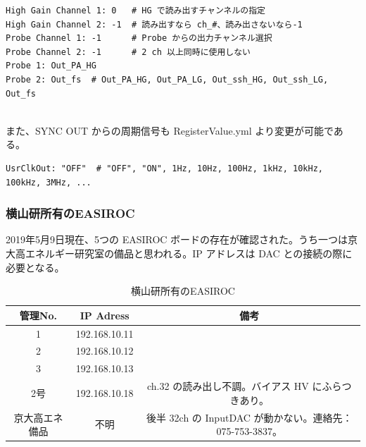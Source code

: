 \begin{shadebox}
\begin{verbatim}
High Gain Channel 1: 0   # HG で読み出すチャンネルの指定
High Gain Channel 2: -1  # 読み出すなら ch_#、読み出さないなら-1
Probe Channel 1: -1      # Probe からの出力チャンネル選択
Probe Channel 2: -1      # 2 ch 以上同時に使用しない
Probe 1: Out_PA_HG
Probe 2: Out_fs  # Out_PA_HG, Out_PA_LG, Out_ssh_HG, Out_ssh_LG, Out_fs
\end{verbatim}
\end{shadebox}
　\\
また、SYNC OUT からの周期信号も RegisterValue.yml より変更が可能である。

\begin{shadebox}
\begin{verbatim}
UsrClkOut: "OFF"  # "OFF", "ON", 1Hz, 10Hz, 100Hz, 1kHz, 10kHz, 100kHz, 3MHz, ...
\end{verbatim}
\end{shadebox}


\newpage
\subsubsection{横山研所有のEASIROC}
2019年5月9日現在、5つの EASIROC ボードの存在が確認された。うち一つは京大高エネルギー研究室の備品と思われる。IP アドレスは DAC との接続の際に必要となる。
\begin{table}[H]
\begin{center}
\caption{横山研所有のEASIROC}
\begin{tabular}{ccc} \hline
管理No. & IP Adress & 備考 \\ \hline
1 & 192.168.10.11 &  \\ 
2 & 192.168.10.12 &  \\ 
3 & 192.168.10.13 &  \\ 
2号 & 192.168.10.18 & ch.32 の読み出し不調。バイアス HV にふらつきあり。 \\ 
京大高エネ備品 & 不明 & 後半 32ch の InputDAC が動かない。連絡先：075-753-3837。  \\ \hline
\end{tabular}
\end{center}
\end{table}


\newpage

